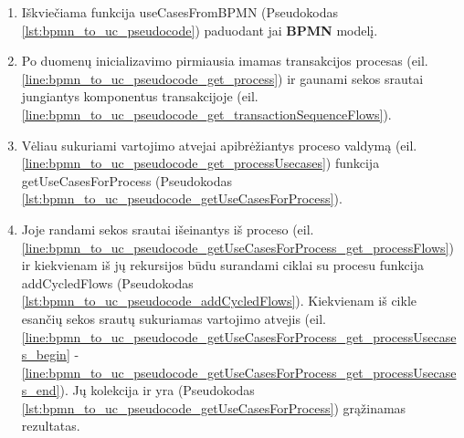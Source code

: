 \documentclass{VUMIFInfBakalaurinis}
\begin{document}
\renewcommand{\lstlistingname}{Pseudokodas}%
\renewcommand{\lstlistlistingname}{Pseudokodo fragmentai}%
\begin{enumerate}
	\item Iškviečiama funkcija useCasesFromBPMN (Pseudokodas \ref{lst:bpmn_to_uc_pseudocode}) paduodant jai \textbf{BPMN} modelį.
	
	\item Po duomenų inicializavimo pirmiausia imamas transakcijos procesas (eil. \ref{line:bpmn_to_uc_pseudocode_get_process}) ir gaunami sekos srautai jungiantys komponentus transakcijoje (eil. \ref{line:bpmn_to_uc_pseudocode_get_transactionSequenceFlows}). 
	\item Vėliau sukuriami vartojimo atvejai apibrėžiantys proceso valdymą (eil. \ref{line:bpmn_to_uc_pseudocode_get_processUsecases}) funkcija getUseCasesForProcess (Pseudokodas  \ref{lst:bpmn_to_uc_pseudocode_getUseCasesForProcess}).
	
	\item Joje randami sekos srautai išeinantys iš proceso (eil. \ref{line:bpmn_to_uc_pseudocode_getUseCasesForProcess_get_processFlows}) ir kiekvienam iš jų rekursijos būdu surandami ciklai su procesu funkcija addCycledFlows (Pseudokodas  \ref{lst:bpmn_to_uc_pseudocode_addCycledFlows}). Kiekvienam iš cikle esančių sekos srautų sukuriamas vartojimo atvejis (eil. \ref{line:bpmn_to_uc_pseudocode_getUseCasesForProcess_get_processUsecases_begin} - \ref{line:bpmn_to_uc_pseudocode_getUseCasesForProcess_get_processUsecases_end}). Jų kolekcija ir yra (Pseudokodas  \ref{lst:bpmn_to_uc_pseudocode_getUseCasesForProcess}) grąžinamas rezultatas.
	

\end{enumerate}
\end{document}

